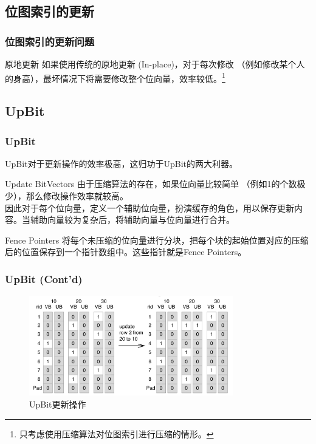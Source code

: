 \documentclass[hyperref={unicode=true}]{beamer}
\begin{document}
\subsection{位图索引的更新}
\begin{frame}\frametitle{位图索引的更新问题}
  \begin{block}{原地更新}
    如果使用传统的原地更新 (In-place)，对于每次修改 （例如修改某个人的身高），最坏情况下将需要修改整个位向量，效率较低。\footnote{只考虑使用压缩算法对位图索引进行压缩的情形。}
  \end{block}
\end{frame}

\subsection{UpBit}
\begin{frame}\frametitle{UpBit}
  UpBit对于更新操作的效率极高，这归功于UpBit的两大利器。
  \pause
  \begin{exampleblock}{Update BitVectors}
    由于压缩算法的存在，如果位向量比较简单 （例如1的个数极少），那么修改操作效率就较高。\\
    因此对于每个位向量，定义一个辅助位向量，扮演缓存的角色，用以保存更新内容。当辅助向量较为复杂后，将辅助向量与位向量进行合并。
  \end{exampleblock}
  \pause
  \begin{exampleblock}{Fence Pointers}
    将每个未压缩的位向量进行分块，把每个块的起始位置对应的压缩后的位置保存到一个指针数组中。这些指针就是Fence Pointers。
  \end{exampleblock}
\end{frame}

\begin{frame}\frametitle{UpBit (Cont'd)}
  \begin{figure}[H]
    \begin{center}
      \includegraphics[width=3.5in]{upbit.png}
      \caption{UpBit更新操作}\label{fig:upbit}
    \end{center}
  \end{figure}
\end{frame}
\end{document}
